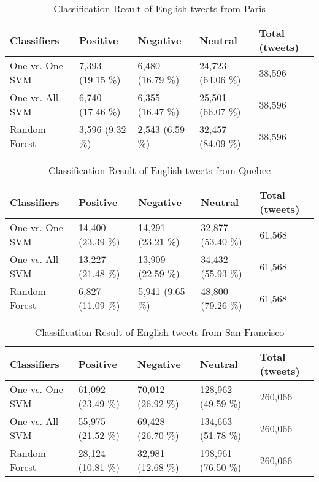 \begin{table}[ht]
	\caption{Classification Result of English tweets from Paris}
	\begin{tabular}{|l|p{1.8cm}|p{1.8cm}|p{1.8cm}|p{1.8cm}|} \hline
	Classifiers & Positive & Negative & Neutral & Total (tweets)\\ \hline
One vs. One SVM & 7,393 (19.15  \%)& 6,480 (16.79  \%)& 24,723 (64.06 \%)& 38,596 \\ \hline
One vs. All SVM & 6,740 (17.46 \%)& 6,355 (16.47 \%)& 25,501 (66.07 \%)& 38,596 \\ \hline
Random Forest   & 3,596 \newline(9.32 \%)& 2,543 \newline(6.59 \%)& 32,457 (84.09 \%)& 38,596 \\ \hline
	\end{tabular}
	\label{tab:result_paris_en}
\end{table}

\begin{table}[ht]
	\caption{Classification Result of English tweets from Quebec}
	\begin{tabular}{|l|p{1.8cm}|p{1.8cm}|p{1.8cm}|p{1.8cm}|} \hline
	Classifiers & Positive & Negative & Neutral & Total (tweets)\\ \hline
	One vs. One SVM & 14,400 (23.39 \%)& 14,291 (23.21 \%)& 32,877 (53.40 \%)& 61,568 \\ \hline
	One vs. All SVM & 13,227 (21.48 \%)& 13,909 (22.59 \%)& 34,432 (55.93 \%)& 61,568 \\ \hline
	Random Forest   & 6,827 (11.09 \%) & 5,941 \newline(9.65 \%) & 48,800 (79.26 \%)& 61,568 \\ \hline
	\end{tabular}
	\label{tab:result_quebec_en}
\end{table}


\begin{table}[ht]
	\caption{Classification Result of English tweets from San Francisco}
	\begin{tabular}{|l|p{1.8cm}|p{1.8cm}|p{1.8cm}|p{1.8cm}|} \hline
	Classifiers & Positive & Negative & Neutral & Total (tweets)\\ \hline
	
	One vs. One SVM & 61,092 (23.49 \%)& 70,012 (26.92 \%)& 128,962 (49.59 \%)& 260,066 \\ \hline
	One vs. All SVM & 55,975 (21.52 \%)& 69,428 (26.70 \%)& 134,663 (51.78 \%)& 260,066 \\ \hline
	Random Forest   & 28,124 (10.81 \%)& 32,981 (12.68 \%)& 198,961 (76.50 \%)& 260,066 \\ \hline
	\end{tabular}
	\label{tab:result_sf_en}
\end{table}



